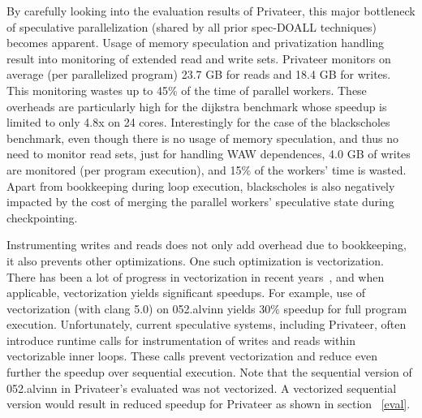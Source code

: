 By carefully looking into the evaluation results of Privateer, this major
bottleneck of speculative parallelization (shared by all prior spec-DOALL
techniques) becomes apparent.
%
Usage of memory speculation and privatization handling result into monitoring of
extended read and write sets.
%
Privateer monitors on average (per parallelized program) 23.7 GB for reads and
18.4 GB for writes.  This monitoring wastes up to 45\% of the time of parallel
workers.
%
These overheads are particularly high for the dijkstra benchmark whose speedup
is limited to only 4.8x on 24 cores.
%
Interestingly for the case of the blackscholes benchmark, even though there is
no usage of memory speculation, and thus no need to monitor read sets, just for
handling WAW dependences, 4.0 GB of writes are monitored (per program
execution), and 15\% of the workers' time is wasted.
%
Apart from bookkeeping during loop execution, blackscholes is also negatively
impacted by the cost of merging the parallel workers' speculative state during
checkpointing.

Instrumenting writes and reads does not only add overhead due to bookkeeping, it
also prevents other optimizations.
%
One such optimization is vectorization.  There has been a lot of progress in
vectorization in recent years~\cite{.., llvm, MIT, inte}, and when applicable,
vectorization yields significant speedups.
%
For example, use of vectorization (with clang 5.0) on 052.alvinn yields 30\%
speedup for full program execution.  Unfortunately, current speculative systems,
including Privateer, often introduce runtime calls for instrumentation of writes
and reads within vectorizable inner loops. These calls prevent vectorization and
reduce even further the speedup over sequential execution.
%
%
Note that the sequential version of 052.alvinn in Privateer's evaluated was not
vectorized. A vectorized sequential version would result in reduced speedup for
Privateer as shown in section ~\ref{eval}.


